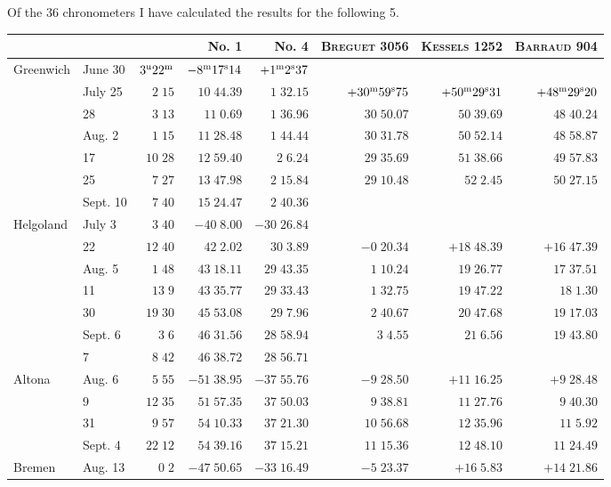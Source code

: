 Of the 36 chronometers I have calculated the results for the following 5.

\begin{center}
\begingroup\fontsize{8}{10}\selectfont\setlength{\tabcolsep}{2pt}
\begin{tabular}{ll|r|r|r|r|r|r}
 & & & No. 1 & No. 4 & \textsc{Breguet} 3056 & \textsc{Kessels} 1252 & \textsc{Barraud} 904 \\
\hline
Greenwich & June 30 & $3^{\rm u}22^{\rm m}$ & $-8^{\rm m}17^{\rm s}14$ & $+1^{\rm m}2^{\rm s}37$ &  &  &  \\
 & July 25 & $2\;15$ & $10\;44.39$ & $1\;32.15$ & $+30^{\rm m}59^{\rm s}75$ & $+50^{\rm m}29^{\rm s}31$ & $+48^{\rm m}29^{\rm s}20$ \\
 & 28 & $3\;13$ & $11\;0.69$ & $1\;36.96$ & $30\;50.07$ & $50\;39.69$ & $48\;40.24$ \\
 & Aug. 2 & $1\;15$ & $11\;28.48$ & $1\;44.44$ & $30\;31.78$ & $50\;52.14$ & $48\;58.87$ \\
 & 17 & $10\;28$ & $12\;59.40$ & $2\;6.24$ & $29\;35.69$ & $51\;38.66$ & $49\;57.83$ \\
 & 25 & $7\;27$ & $13\;47.98$ & $2\;15.84$ & $29\;10.48$ & $52\;2.45$ & $50\;27.15$ \\
 & Sept. 10 & $7\;40$ & $15\;24.47$ & $2\;40.36$ &  &  &  \\
Helgoland & July 3 & $3\;40$ & $-40\;8.00$ & $-30\;26.84$ &  &  &  \\
 & 22 & $12\;40$ & $42\;2.02$ & $30\;3.89$ & $-0\;20.34$ & $+18\;48.39$ & $+16\;47.39$ \\
 & Aug. 5 & $1\;48$ & $43\;18.11$ & $29\;43.35$ & $1\;10.24$ & $19\;26.77$ & $17\;37.51$ \\
 & 11 & $13\;9$ & $43\;35.77$ & $29\;33.43$ & $1\;32.75$ & $19\;47.22$ & $18\;1.30$ \\
 & 30 & $19\;30$ & $45\;53.08$ & $29\;7.96$ & $2\;40.67$ & $20\;47.68$ & $19\;17.03$ \\
 & Sept. 6 & $3\;6$ & $46\;31.56$ & $28\;58.94$ & $3\;4.55$ & $21\;6.56$ & $19\;43.80$ \\
 & 7 & $8\;42$ & $46\;38.72$ & $28\;56.71$ &  &  &  \\
Altona & Aug. 6 & $5\;55$ & $-51\;38.95$ & $-37\;55.76$ & $-9\;28.50$ & $+11\;16.25$ & $+9\;28.48$ \\
 & 9 & $12\;35$ & $51\;57.35$ & $37\;50.03$ & $9\;38.81$ & $11\;27.76$ & $9\;40.30$ \\
 & 31 & $9\;57$ & $54\;10.33$ & $37\;21.30$ & $10\;56.68$ & $12\;35.96$ & $11\;5.92$ \\
 & Sept. 4 & $22\;12$ & $54\;39.16$ & $37\;15.21$ & $11\;15.36$ & $12\;48.10$ & $11\;24.49$ \\
Bremen & Aug. 13 & $0\;2$ & $-47\;50.65$ & $-33\;16.49$ & $-5\;23.37$ & $+16\;5.83$ & $+14\;21.86$ \\
\end{tabular}
\endgroup
\end{center}

